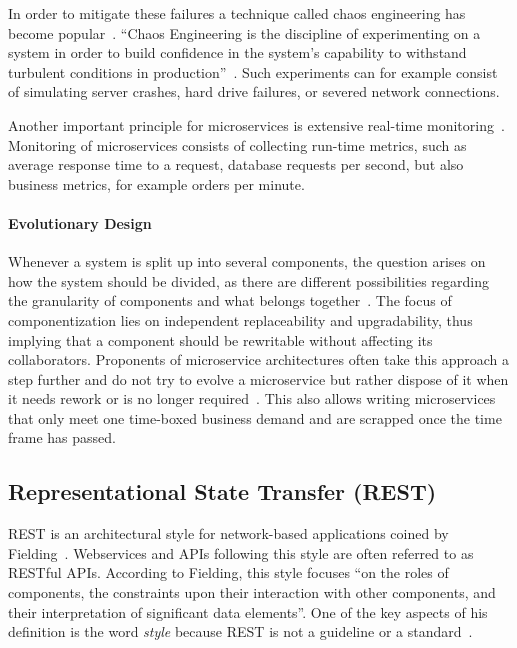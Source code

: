 In order to mitigate these failures a technique called chaos engineering has become popular~\cite{CEC2018}.
``Chaos Engineering is the discipline of experimenting on a system in order to build confidence in the system's capability to withstand turbulent conditions in production''~\cite{CEC2018}.
Such experiments can for example consist of simulating server crashes, hard drive failures, or severed network connections.

Another important principle for microservices is extensive real-time monitoring~\cite{Lewis2014}.
Monitoring of microservices consists of collecting run-time metrics, such as average response time to a request, database requests per second, but also business metrics, for example orders per minute.

\paragraph{Evolutionary Design}

Whenever a system is split up into several components, the question arises on how the system should be divided, as there are different possibilities regarding the granularity of components and what belongs together~\cite{Lewis2014}.
The focus of componentization lies on independent replaceability and upgradability, thus implying that a component should be rewritable without affecting its collaborators.
Proponents of microservice architectures often take this approach a step further and do not try to evolve a microservice but rather dispose of it when it needs rework or is no longer required~\cite{Fowler2016,Lewis2014}.
This also allows writing microservices that only meet one time-boxed business demand and are scrapped once the time frame has passed.

\subsection{Representational State Transfer (\acs{REST})}

\ac{REST} is an architectural style for network-based applications coined by Fielding~\cite{Fielding2000}.
Webservices and \acp{API} following this style are often referred to as \acs{REST}ful \acp{API}.
According to Fielding, this style focuses ``on the roles of components, the constraints upon their interaction with other components, and their interpretation of significant data elements''.
One of the key aspects of his definition is the word \textit{style} because \ac{REST} is not a guideline or a standard~\cite{Malakhov2018}.

